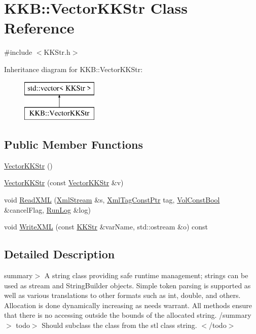 \hypertarget{class_k_k_b_1_1_vector_k_k_str}{}\section{K\+KB\+:\+:Vector\+K\+K\+Str Class Reference}
\label{class_k_k_b_1_1_vector_k_k_str}


{\ttfamily \#include $<$K\+K\+Str.\+h$>$}

Inheritance diagram for K\+KB\+:\+:Vector\+K\+K\+Str\+:\begin{figure}[H]
\begin{center}
\leavevmode
\includegraphics[height=2.000000cm]{class_k_k_b_1_1_vector_k_k_str}
\end{center}
\end{figure}
\subsection*{Public Member Functions}
\begin{DoxyCompactItemize}
\item 
\hyperlink{class_k_k_b_1_1_vector_k_k_str_a8fffb71b681560151fdc653f39c3f7dc}{Vector\+K\+K\+Str} ()
\item 
\hyperlink{class_k_k_b_1_1_vector_k_k_str_a9b4aed0260683b87aacd9cbaeb6cb223}{Vector\+K\+K\+Str} (const \hyperlink{class_k_k_b_1_1_vector_k_k_str}{Vector\+K\+K\+Str} \&v)
\item 
void \hyperlink{class_k_k_b_1_1_vector_k_k_str_a8c1a3b54afb48156b5d462dc2faa0307}{Read\+X\+ML} (\hyperlink{class_k_k_b_1_1_xml_stream}{Xml\+Stream} \&s, \hyperlink{namespace_k_k_b_a5f1b0b1667d79fec26deeff10c43df23}{Xml\+Tag\+Const\+Ptr} tag, \hyperlink{namespace_k_k_b_a7d390f568e2831fb76b86b56c87bf92f}{Vol\+Const\+Bool} \&cancel\+Flag, \hyperlink{class_k_k_b_1_1_run_log}{Run\+Log} \&log)
\item 
void \hyperlink{class_k_k_b_1_1_vector_k_k_str_a3e90bf5fd9c23a8c16f0fdee98946395}{Write\+X\+ML} (const \hyperlink{class_k_k_b_1_1_k_k_str}{K\+K\+Str} \&var\+Name, std\+::ostream \&o) const 
\end{DoxyCompactItemize}


\subsection{Detailed Description}
summary$>$ A string class providing safe runtime management; strings can be used as stream and String\+Builder objects. Simple token parsing is supported as well as various translations to other formats such as \textquotesingle{}int\textquotesingle{}, \textquotesingle{}double\textquotesingle{}, and others. Allocation is done dynamically increasing as needs warrant. All methods ensure that there is no accessing outside the bounds of the allocated string. /summary$>$ todo$>$ Should subclass the class from the stl class \textquotesingle{}string\textquotesingle{}. $<$/todo$>$ 

